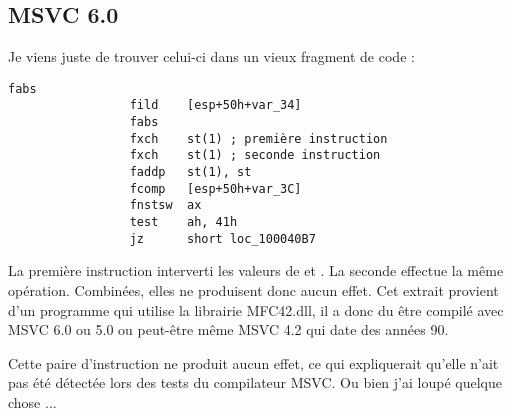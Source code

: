 ﻿\subsection{MSVC 6.0}

Je viens juste de trouver celui-ci dans un vieux fragment de code :

\begin{lstlisting}[style=customasmx86]
                 fabs
                 fild    [esp+50h+var_34]
                 fabs
                 fxch    st(1) ; première instruction
                 fxch    st(1) ; seconde instruction
                 faddp   st(1), st
                 fcomp   [esp+50h+var_3C]
                 fnstsw  ax
                 test    ah, 41h
                 jz      short loc_100040B7
\end{lstlisting}

La première instruction  interverti les valeurs de  et . La seconde 
effectue la même opération. Combinées, elles ne produisent donc aucun effet.
Cet extrait provient d'un programme qui utilise la librairie MFC42.dll, il a donc du être compilé 
avec MSVC 6.0 ou 5.0 ou peut-être même MSVC 4.2 qui date des années 90.

Cette paire d'instruction ne produit aucun effet, ce qui expliquerait qu'elle n'ait pas été détectée 
lors des tests du compilateur MSVC. Ou bien j'ai loupé quelque chose ...


